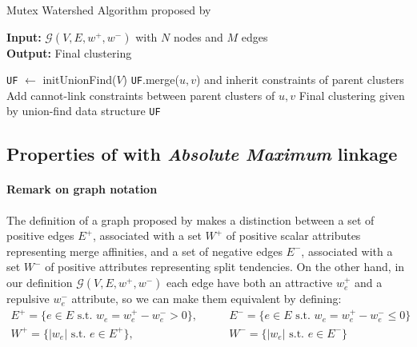 \begin{algorithm}
  \caption{Mutex Watershed Algorithm proposed by \cite{wolf2018mutex}}
\hspace*{\algorithmicindent} \textbf{Input:} $\mathcal{G}(V,E,w^+,w^-)$ with $N$ nodes and $M$ edges \\
\hspace*{\algorithmicindent} \textbf{Output:} Final clustering \\
  \hspace*{\algorithmicindent} 
  \begin{algorithmic}[1]
      \State \texttt{UF} $\gets$ initUnionFind($V$) 
         
            
            \State \texttt{UF}.merge($u,v$) and inherit constraints of parent clusters
            \State Add cannot-link constraints between parent clusters of $u,v$
          \EndIf
        \EndIf
      \EndFor
      \State
      \Return Final clustering given by union-find data structure \texttt{UF}
  \end{algorithmic}
  \label{alg:mutex_watershed}
\end{algorithm}



\subsection{Properties of \algname{} with \emph{Absolute Maximum} linkage}\label{sec:appendix_abs_max}
\paragraph{Remark on graph notation} The definition of a graph proposed by \cite{wolf2018mutex} makes a distinction between a set of positive edges $E^+$, associated with a set $W^+$ of positive scalar attributes representing merge affinities, and a set of negative edges $E^-$, associated with a set $W^-$ of positive attributes representing split tendencies. On the other hand, in our definition $\mathcal{G}(V,E,w^+,w^-)$ each edge have both an attractive $w_e^+$ and a repulsive $w_e^-$ attribute, so we can make them equivalent by defining:
\begin{align}
E^+ = \{ e \in E \,\,\text{s.t.} \,\,w_e = w_e^+ - w_e^- > 0\},& \qquad E^- = \{ e \in E \,\,\text{s.t.}\,\, w_e = w_e^+ - w_e^- \leq 0\} \\
W^+ = \{ |w_e| \,\,\text{s.t.}\,\, e \in E^+\},& \qquad W^- = \{ |w_e| \,\,\text{s.t.}\,\, e \in E^-\}
\end{align}

